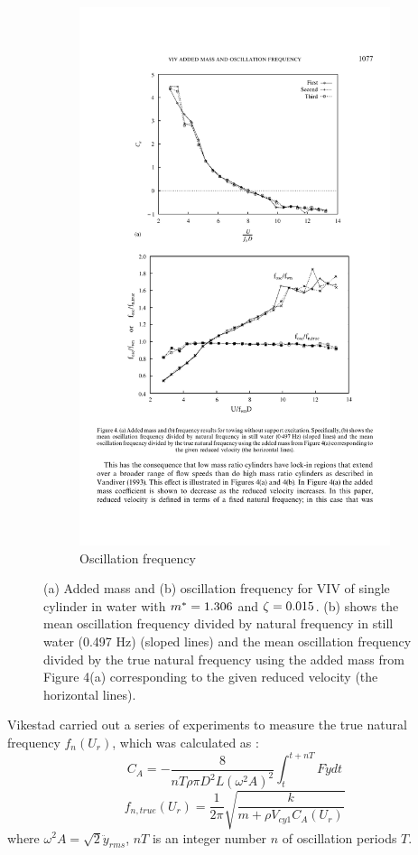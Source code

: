 \begin{figure}[tbp]
\begin{subfigure}[b]{\linewidth}
		\includegraphics[width=0.7\linewidth]{Figs/fnur}
		\caption{Oscillation frequency}
		\label{fig:fnur}
	\end{subfigure}%
	\caption{
		(a) Added mass and (b) oscillation frequency for VIV of single cylinder in water with $ m^* =1.306$ and $ \zeta=0.015 $. (b) shows the mean oscillation frequency divided by natural frequency in still water (0.497 Hz) (sloped lines) and the mean oscillation frequency divided by the true natural frequency using the added mass from Figure 4(a) corresponding to the given reduced velocity (the horizontal lines). \cite{VIKESTAD2000}
	}
	\label{fig:cafnur}
\end{figure}

Vikestad \etal{} \cite{VIKESTAD2000} carried out a series of experiments to measure the true natural frequency $f_n(U_r)$, which was calculated as :
\begin{equation}\label{eq:caur}
C_A=-\frac{8}{nT\rho \pi D^2 L(\omega^2 A)^2} \int_{t}^{t+nT} F \ddot{y} dt
\end{equation}
\begin{equation}\label{eq:fnur}
f_{n,true}(U_r)=\frac{1}{2\pi}\sqrt{\frac{k}{m+\rho V_{cy1} C_A(U_r)}}
\end{equation}
where $ \omega^2 A=\sqrt{2} \ddot{y}_{rms} $, $ nT $ is an integer number $ n $ of oscillation periods $ T $.


